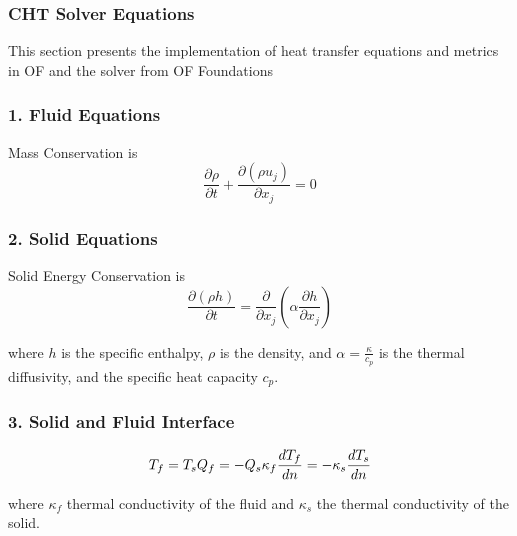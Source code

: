 \subsubsection{CHT Solver Equations}    

This section presents the implementation of heat transfer equations and metrics in \gls{OF} and the solver from \gls{OF} Foundations \cite{OpenFOAMFoundation}
\subsubsection{1. Fluid Equations}

Mass Conservation is 
\begin{equation}
\frac{\partial \rho}{\partial t} + \frac{\partial (\rho u_j)}{\partial x_j} = 0
\end{equation}


     

\subsubsection{2. Solid Equations}
Solid Energy Conservation is \begin{equation}
\frac{\partial (\rho h)}{\partial t} = \frac{\partial}{\partial x_j}\left( \alpha \frac{\partial h}{\partial x_j} \right)
\end{equation}

where \( h \) is the specific enthalpy, \( \rho \) is the density, and \( \alpha = \frac{\kappa}{c_p} \) is the thermal diffusivity, and the specific heat capacity \( c_p \). 


\subsubsection{3. Solid and Fluid Interface}
\begin{equation}
T_f = T_s  \\
Q_f = -Q_s  \\
\kappa_f \frac{d T_f}{d n} = -\kappa_s \frac{d T_s}{d n} 
\end{equation}

where \( \kappa_f \) thermal conductivity of the fluid and \( \kappa_s \)  the thermal conductivity of the solid.







